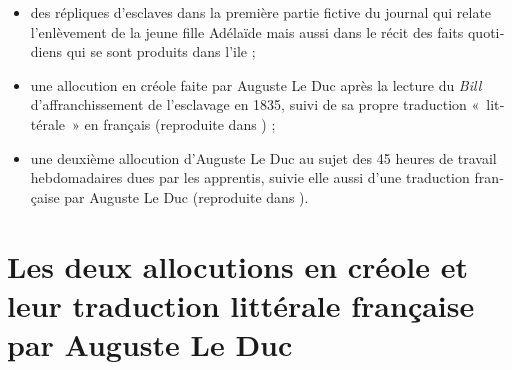 \documentclass[output=paper]{langscibook}
\begin{document}
\begin{otherlanguage}{french}
\begin{itemize}
\item des répliques d’esclaves dans la première partie fictive du journal qui relate l’enlèvement de la jeune fille Adélaïde mais aussi dans le récit des faits quotidiens qui se sont produits dans l’ile ;
\item une allocution en créole faite par Auguste Le Duc après la lecture du \textit{Bill} d’affranchissement de l’esclavage en 1835, suivi de sa propre traduction «~littérale~» en français (reproduite dans ) ;
\item une deuxième allocution d’Auguste Le Duc au sujet des 45 heures de travail hebdomadaires dues par les apprentis, suivie elle aussi d’une traduction française par Auguste Le Duc (reproduite dans ).
\end{itemize}

\section{Les deux allocutions en créole et leur traduction littérale française par Auguste Le Duc}\label{sec:kriegel:3}


\end{otherlanguage}
\end{document}

